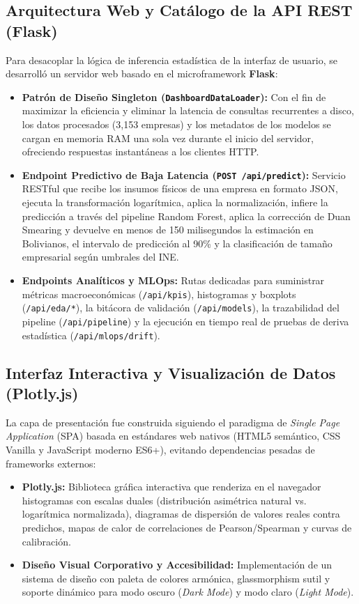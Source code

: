 \subsection{Arquitectura Web y Catálogo de la API REST (Flask)}
Para desacoplar la lógica de inferencia estadística de la interfaz de usuario, se desarrolló un servidor web basado en el microframework \textbf{Flask}:
\begin{itemize}
    \item \textbf{Patrón de Diseño Singleton (\texttt{DashboardDataLoader}):} Con el fin de maximizar la eficiencia y eliminar la latencia de consultas recurrentes a disco, los datos procesados (3,153 empresas) y los metadatos de los modelos se cargan en memoria RAM una sola vez durante el inicio del servidor, ofreciendo respuestas instantáneas a los clientes HTTP.
    \item \textbf{Endpoint Predictivo de Baja Latencia (\texttt{POST /api/predict}):} Servicio RESTful que recibe los insumos físicos de una empresa en formato JSON, ejecuta la transformación logarítmica, aplica la normalización, infiere la predicción a través del pipeline Random Forest, aplica la corrección de Duan Smearing y devuelve en menos de 150 milisegundos la estimación en Bolivianos, el intervalo de predicción al 90\% y la clasificación de tamaño empresarial según umbrales del INE.
    \item \textbf{Endpoints Analíticos y MLOps:} Rutas dedicadas para suministrar métricas macroeconómicas (\texttt{/api/kpis}), histogramas y boxplots (\texttt{/api/eda/*}), la bitácora de validación (\texttt{/api/models}), la trazabilidad del pipeline (\texttt{/api/pipeline}) y la ejecución en tiempo real de pruebas de deriva estadística (\texttt{/api/mlops/drift}).
\end{itemize}

\subsection{Interfaz Interactiva y Visualización de Datos (Plotly.js)}
La capa de presentación fue construida siguiendo el paradigma de \textit{Single Page Application} (SPA) basada en estándares web nativos (HTML5 semántico, CSS Vanilla y JavaScript moderno ES6+), evitando dependencias pesadas de frameworks externos:
\begin{itemize}
    \item \textbf{Plotly.js:} Biblioteca gráfica interactiva que renderiza en el navegador histogramas con escalas duales (distribución asimétrica natural vs. logarítmica normalizada), diagramas de dispersión de valores reales contra predichos, mapas de calor de correlaciones de Pearson/Spearman y curvas de calibración.
    \item \textbf{Diseño Visual Corporativo y Accesibilidad:} Implementación de un sistema de diseño con paleta de colores armónica, glassmorphism sutil y soporte dinámico para modo oscuro (\textit{Dark Mode}) y modo claro (\textit{Light Mode}).
\end{itemize}

